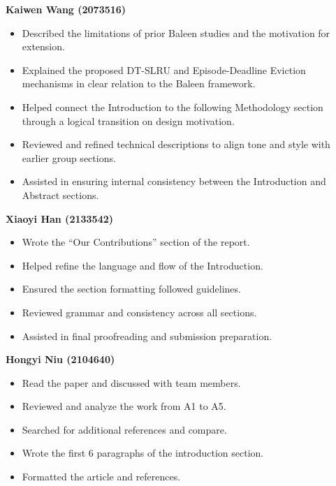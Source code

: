 \documentclass[sigconf]{acmart}
\begin{document}
\textbf{Kaiwen Wang (2073516)}  
\begin{itemize}
    \item Described the limitations of prior Baleen studies and the motivation for extension.  
    \item Explained the proposed DT-SLRU and Episode-Deadline Eviction mechanisms in clear relation to the Baleen framework.  
    \item Helped connect the Introduction to the following Methodology section through a logical transition on design motivation.  
    \item Reviewed and refined technical descriptions to align tone and style with earlier group sections.  
    \item Assisted in ensuring internal consistency between the Introduction and Abstract sections.  
\end{itemize}

\textbf{Xiaoyi Han (2133542)}
\begin{itemize}
  \item Wrote the “Our Contributions” section of the report. 
  \item Helped refine the language and flow of the Introduction.
  \item Ensured the section formatting followed guidelines.  
  \item Reviewed grammar and consistency across all sections.
  \item Assisted in final proofreading and submission preparation. 
\end{itemize}

\textbf{Hongyi Niu (2104640)}
\begin{itemize}
  \item Read the paper and discussed with team members.
  \item Reviewed and analyze the work from A1 to A5.
  \item Searched for additional references and compare.
  \item Wrote the first 6 paragraphs of the introduction section.
  \item Formatted the article and references.
\end{itemize}


\clearpage



\appendix




\end{document}
